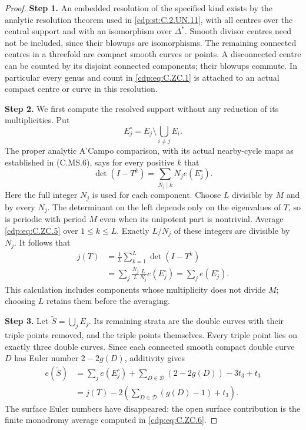 \begin{proof}
\noindent\textbf{Step 1.} An embedded resolution of the specified kind
exists by the analytic resolution theorem used
in \ref{cdp:st:C.2.UN.11}, with all centres over the central
support and with an isomorphism over
$\Delta^*$. Smooth divisor centres need
not be included, since their blowups are
isomorphisms. The remaining connected centres
in a threefold are compact smooth curves or
points. A disconnected centre can be counted
by its disjoint connected components; their
blowups commute. In particular every genus
and count in \eqref{cdp:eq:C.ZC.1} is attached to an actual
compact centre or curve in this resolution.

\noindent\textbf{Step 2.} We first compute the resolved support without
any reduction of its multiplicities. Put
\[
             E_j^\circ=E_j\setminus\bigcup_{i\ne j}E_i.
\]
The proper analytic A'Campo comparison, with
its actual nearby-cycle maps as established
in (C.MS.6), says for every positive $k$ that
\[
         \det(I-T^k)=\sum_{N_j\mid k}N_j e(E_j^\circ).
                                                               \tag{C.ZC.5}\label{cdp:eq:C.ZC.5}
\]
Here the full integer $N_j$ is used for each
component. Choose $L$ divisible by $M$ and
by every $N_j$. The determinant on the left
depends only on the eigenvalues of $T$,
so is periodic with period $M$ even when
its unipotent part is nontrivial. Average
\eqref{cdp:eq:C.ZC.5} over $1\le k\le L$. Exactly $L/N_j$
of these integers are divisible by $N_j$.
It follows that
\[
 \begin{split}
 j(T)
 &=\frac1L\sum_{k=1}^{L}\det(I-T^k)\\
 &=\sum_j\frac{N_j}{L}\frac{L}{N_j}e(E_j^\circ)
   =\sum_j e(E_j^\circ).
 \end{split}                                                   \tag{C.ZC.6}\label{cdp:eq:C.ZC.6}
\]
This calculation includes components whose
multiplicity does not divide $M$; choosing
$L$ retains them before the averaging.

\noindent\textbf{Step 3.} Let $\widetilde S=\bigcup_jE_j$. Its
remaining strata are the double curves
with their triple points removed, and
the triple points themselves. Every
triple point lies on exactly three
double curves. Since each connected
smooth compact double curve $D$ has
Euler number $2-2g(D)$, additivity gives
\[
 \begin{split}
 e(\widetilde S)
 &=\sum_j e(E_j^\circ)
       +\sum_{D\in\mathcal D}(2-2g(D))-3t_3+t_3\\
 &=j(T)-2\left(
           \sum_{D\in\mathcal D}(g(D)-1)+t_3\right).
 \end{split}                                                   \tag{C.ZC.7}\label{cdp:eq:C.ZC.7}
\]
The surface Euler numbers have disappeared:
the open surface contribution is the finite
monodromy average computed in \eqref{cdp:eq:C.ZC.6}.


\end{proof}
